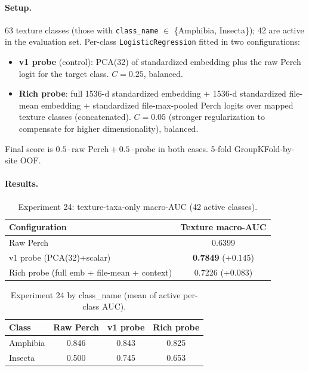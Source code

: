 \paragraph{Setup.}
63 texture classes (those with \texttt{class\_name} $\in$
\{Amphibia, Insecta\}); 42 are active in the evaluation set. Per-class
\texttt{LogisticRegression} fitted in two configurations:
\begin{itemize}
\item \textbf{v1 probe} (control): PCA(32) of standardized embedding plus
the raw Perch logit for the target class. $C{=}0.25$, balanced.
\item \textbf{Rich probe}: full 1536-d standardized embedding $+$ 1536-d
standardized file-mean embedding $+$ standardized file-max-pooled
Perch logits over mapped texture classes (concatenated). $C{=}0.05$
(stronger regularization to compensate for higher dimensionality),
balanced.
\end{itemize}
Final score is $0.5 \cdot \text{raw Perch} + 0.5 \cdot \text{probe}$ in
both cases. 5-fold GroupKFold-by-site OOF.

\paragraph{Results.}
\begin{table}[h]
\centering
\caption{Experiment 24: texture-taxa-only macro-AUC (42 active classes).}
\label{tab:exp24}
\begin{tabular}{lc}
\hline
\textbf{Configuration} & \textbf{Texture macro-AUC} \\
\hline
Raw Perch                                  & 0.6399 \\
v1 probe (PCA(32)+scalar)                  & \textbf{0.7849} ($+0.145$) \\
Rich probe (full emb + file-mean + context)& 0.7226 ($+0.083$) \\
\hline
\end{tabular}
\end{table}

\begin{table}[h]
\centering
\caption{Experiment 24 by class\_name (mean of active per-class AUC).}
\label{tab:exp24-taxa}
\begin{tabular}{lccc}
\hline
\textbf{Class} & \textbf{Raw Perch} & \textbf{v1 probe} & \textbf{Rich probe} \\
\hline
Amphibia & 0.846 & 0.843 & 0.825 \\
Insecta  & 0.500 & 0.745 & 0.653 \\
\hline
\end{tabular}
\end{table}

